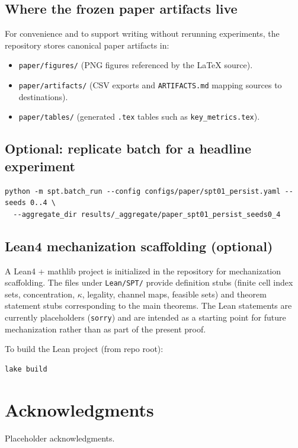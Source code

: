\documentclass[11pt]{article}
\begin{document}
\subsection{Where the frozen paper artifacts live}

For convenience and to support writing without rerunning experiments, the repository stores canonical paper artifacts in:

\begin{itemize}
\item \texttt{paper/figures/} (PNG figures referenced by the LaTeX source).
\item \texttt{paper/artifacts/} (CSV exports and \texttt{ARTIFACTS.md} mapping sources to destinations).
\item \texttt{paper/tables/} (generated \texttt{.tex} tables such as \texttt{key\_metrics.tex}).
\end{itemize}

\subsection{Optional: replicate batch for a headline experiment}

\begin{verbatim}
python -m spt.batch_run --config configs/paper/spt01_persist.yaml --seeds 0..4 \
  --aggregate_dir results/_aggregate/paper_spt01_persist_seeds0_4
\end{verbatim}

\subsection{Lean4 mechanization scaffolding (optional)}

A Lean4 + mathlib project is initialized in the repository for mechanization scaffolding.
The files under \texttt{Lean/SPT/} provide definition stubs (finite cell index sets, concentration, $\kappa$, legality, channel maps, feasible sets) and theorem statement stubs corresponding to the main theorems.
The Lean statements are currently placeholders (\texttt{sorry}) and are intended as a starting point for future mechanization rather than as part of the present proof.

To build the Lean project (from repo root):

\begin{verbatim}
lake build
\end{verbatim}
 
\section*{Acknowledgments}
Placeholder acknowledgments.



\end{document}
